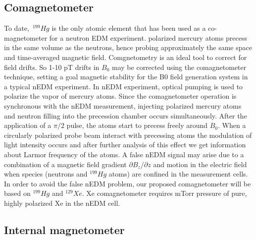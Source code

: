 \subsection{Comagnetometer}
To date,~$^{199}Hg$ is the only atomic element that has been used as a co-magnetometer for a neutron EDM experiment\cite{PhysRevLett.97.131801}\cite{PhysRevLett.102.101601}.  polarized mercury atoms precess in the same volume as the neutrons, hence probing approximately the same space and time-averaged magnetic field.  Comgnetometry is an ideal tool to correct for field drifts.  So 1-10 pT drifts in $B_0$  may be corrected using the comagnetometer technique, setting a goal magnetic stability for the B0  field generation system in a typical nEDM experiment\cite{PhysRevLett.97.131801}\cite{afach:in2p3-01062292}. In nEDM experiment, optical pumping is used to polarize the vapor of mercury atoms. Since the comagnetometer operation is synchronous with the nEDM measurement, injecting polarized mercury atoms and  neutron filling into the precession chamber occurs simultaneously. After the application of a $\pi/2$ pulse, the atoms start to precess freely around $B_0$. When a circularly polarized probe beam interact with precessing atoms the modulation of light intensity occurs and after further analysis of  this effect we get information about Larmor frequency of the atoms. A false nEDM signal may arise due to a combination of a magnetic field gradient $\partial B_{z}/{\partial  z}$ and motion in the electric field when species (neutrons and $^{199}Hg$ atoms) are confined in the measurement cells. In order to avoid the false nEDM problem, our proposed comagnetometer will be based on $^{199}Hg$ and $^{129}Xe$. Xe comagnetometer requires mTorr pressure of pure,
highly polarized Xe in the nEDM cell.

\subsection{Internal magnetometer}

